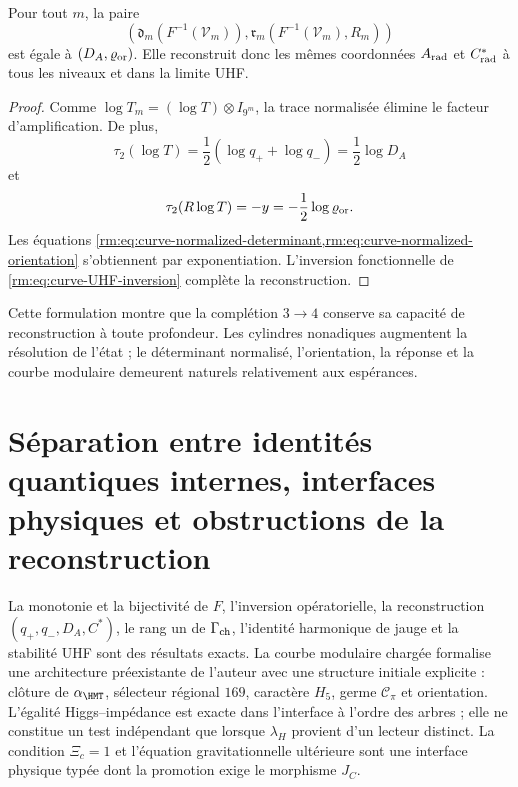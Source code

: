 \begin{proposition}
\label{rm:prop:curve-UHF-tomography} Pour tout \(m\), la paire
\begin{equation}
 \left(
 \mathfrak d_m(F^{-1}(\mathcal V_m)),
 \mathfrak r_m(F^{-1}(\mathcal V_m),R_m)
 \right)
 \label{rm:eq:curve-UHF-pair}
\end{equation}
est égale à \((D_A,\varrho_{\rm or})\). Elle reconstruit donc les mêmes coordonnées \(A_{\rm rad}\) et \(C^*_{\rm rad}\) à tous les niveaux et dans la limite UHF.
\end{proposition}

\begin{proof}
Comme \(\log T_m=(\log T)\otimes I_{9^m}\), la trace normalisée élimine le facteur d’amplification. De plus,
\[
 \tau_2(\log T)=\frac12(\log q_++\log q_-)=\frac12\log D_A
\]
et
\[
 \tau_2(R\log T)=-y=-\frac12\log\varrho_{\rm or}.
\]
Les équations \cref{rm:eq:curve-normalized-determinant,rm:eq:curve-normalized-orientation} s’obtiennent par exponentiation. L’inversion fonctionnelle de \cref{rm:eq:curve-UHF-inversion} complète la reconstruction.
\end{proof}

Cette formulation montre que la complétion \(3\to4\) conserve sa capacité de reconstruction à toute profondeur. Les cylindres nonadiques augmentent la résolution de l’état ; le déterminant normalisé, l’orientation, la réponse et la courbe modulaire demeurent naturels relativement aux espérances.

\section{Séparation entre identités quantiques internes, interfaces physiques et obstructions de la reconstruction}

\begin{proofstatusbox}
La monotonie et la bijectivité de \(F\), l’inversion opératorielle, la reconstruction \((q_+,q_-,D_A,C^*)\), le rang un de \(\Gamma_{\rm ch}\), l’identité harmonique de jauge et la stabilité UHF sont des résultats exacts. La courbe modulaire chargée formalise une architecture préexistante de l’auteur avec une structure initiale explicite : clôture de \(\alpha_{\HMT}\), sélecteur régional \(169\), caractère \(H_5\), germe \(\mathcal C_\pi\) et orientation. L’égalité Higgs--impédance est exacte dans l’interface à l’ordre des arbres ; elle ne constitue un test indépendant que lorsque \(\lambda_H\) provient d’un lecteur distinct. La condition \(\Xi_c=1\) et l’équation gravitationnelle ultérieure sont une interface physique typée dont la promotion exige le morphisme \(J_C\).
\end{proofstatusbox}

